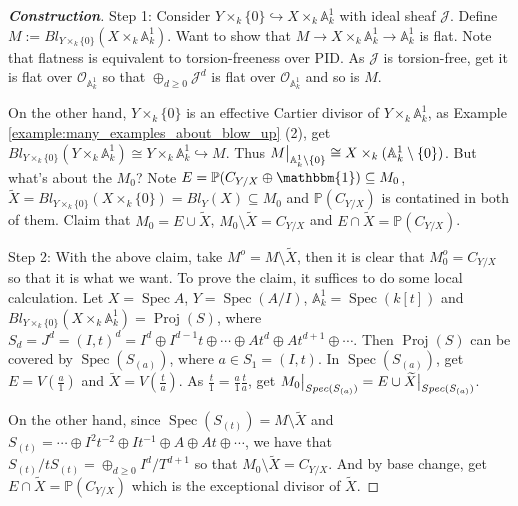 \documentclass{ctexart}
\newcommand{\spec}{\operatorname{Spec}}
\newcommand{\proj}{\operatorname{Proj}}
\begin{document}
\begin{proof}[\textbf{\emph{Construction}}]
    Step 1: Consider $Y \times_{k} \{0\} \hookrightarrow X \times_{k} \mathbb{A}_{k}^{1}$ with ideal sheaf $\mathcal{J}$.
    Define $M := Bl_{Y \times_{k} \{0\}}(X \times_{k} \mathbb{A}_{k}^{1})$.
    Want to show that $M \longrightarrow X \times_{k} \mathbb{A}_{k}^{1} \longrightarrow \mathbb{A}_{k}^{1}$ is flat.
    Note that flatness is equivalent to torsion-freeness over PID.
    As $\mathcal{J}$ is torsion-free, get it is flat over $\mathcal{O}_{\mathbb{A}_{k}^{1}}$ so that $\oplus_{d \ge 0} \mathcal{J}^{d}$ is flat over $\mathcal{O}_{\mathbb{A}_{k}^{1}}$ and so is $M$.
    \par
    On the other hand, $Y \times_{k} \{0\}$ is an effective Cartier divisor of $Y \times_{k} \mathbb{A}_{k}^{1}$, as Example \ref{example:many_examples_about_blow_up} (2), get $Bl_{Y \times_{k} \{0\}}(Y \times_{k} \mathbb{A}_{k}^{1}) \cong Y \times_{k} \mathbb{A}_{k}^{1} \hookrightarrow M$.
    Thus $M\big{|}_{\mathbb{A}_{k}^{1} \setminus \{0\}} \cong X \times_{k} (\mathbb{A}_{k}^{1} \setminus \{0\})$.
    But what's about the $M_{0}$?
    Note $E = \mathbb{P}(C_{Y/X} \oplus \mathbbm{1}) \subseteq M_{0}$, $\widetilde{X} = Bl_{Y \times_{k} \{0\}}(X \times_{k} \{0\}) = Bl_{Y}(X) \subseteq M_{0}$ and $\mathbb{P}(C_{Y/X})$ is contatined in both of them.
    Claim that $M_{0} = E \cup \widetilde{X}$, $M_{0} \setminus \widetilde{X} = C_{Y/X}$ and $E \cap \widetilde{X} = \mathbb{P}(C_{Y/X})$.
    \par
    Step 2: With the above claim, take $M^{o} = M \setminus \widetilde{X}$, then it is clear that $M_{0}^{o} = C_{Y/X}$ so that it is what we want.
    To prove the claim, it suffices to do some local calculation.
    Let $X = \spec A$, $Y = \spec(A/I)$, $\mathbb{A}_{k}^{1} = \spec(k[t])$ and $Bl_{Y \times_{k} \{0\}}(X \times_{k} \mathbb{A}_{k}^{1}) = \proj(S)$, where $S_{d} = J^{d} = (I, t)^{d} = I^{d} \oplus I^{d - 1}t \oplus \cdots \oplus At^{d} \oplus At^{d + 1} \oplus \cdots$.
    Then $\proj(S)$ can be covered by $\spec(S_{(a)})$, where $a\in S_{1} = (I, t)$.
    In $\spec(S_{(a)})$, get $E = V(\frac{a}{1})$ and $\widetilde{X} = V(\frac{t}{a})$.
    As $\frac{t}{1} = \frac{a}{1}\frac{t}{a}$, get $M_{0}\big{|}_{Spec(S_{(a)})} = E \cup \widetilde{X}\big{|}_{Spec(S_{(a)})}$.
    \par
    On the other hand, since $\spec(S_{(t)}) = M \setminus \widetilde{X}$ and $S_{(t)} = \cdots \oplus I^{2}t^{-2} \oplus It^{-1} \oplus A \oplus At \oplus \cdots $,
    we have that $S_{(t)}/tS_{(t)} = \oplus_{d \ge 0} I^{d}/T^{d + 1}$ so that $M_{0} \setminus \widetilde{X} = C_{Y/X}$.
    And by base change, get $E \cap \widetilde{X} = \mathbb{P}(C_{Y/X})$ which is the exceptional divisor of $\widetilde{X}$.
\end{proof} 
\end{document}
